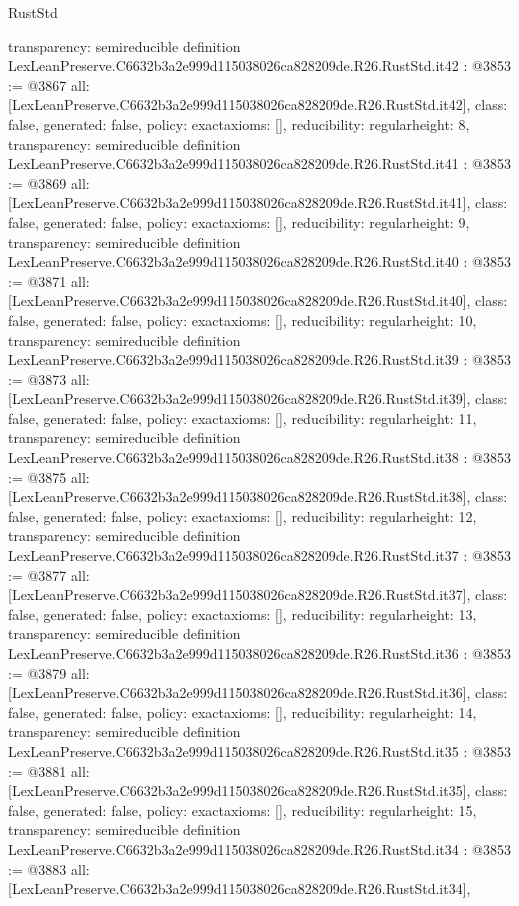 \begin{lexlean}{RustStd}
\begin{coremodule}
{  transparency: semireducible
}
definition LexLeanPreserve.C6632b3a2e999d115038026ca828209de.R26.RustStd.it42 : @3853 := @3867 {
  all: [LexLeanPreserve.C6632b3a2e999d115038026ca828209de.R26.RustStd.it42],
  class: false,
  generated: false,
  policy: exact{axioms: []},
  reducibility: regular{height: 8},
  transparency: semireducible
}
definition LexLeanPreserve.C6632b3a2e999d115038026ca828209de.R26.RustStd.it41 : @3853 := @3869 {
  all: [LexLeanPreserve.C6632b3a2e999d115038026ca828209de.R26.RustStd.it41],
  class: false,
  generated: false,
  policy: exact{axioms: []},
  reducibility: regular{height: 9},
  transparency: semireducible
}
definition LexLeanPreserve.C6632b3a2e999d115038026ca828209de.R26.RustStd.it40 : @3853 := @3871 {
  all: [LexLeanPreserve.C6632b3a2e999d115038026ca828209de.R26.RustStd.it40],
  class: false,
  generated: false,
  policy: exact{axioms: []},
  reducibility: regular{height: 10},
  transparency: semireducible
}
definition LexLeanPreserve.C6632b3a2e999d115038026ca828209de.R26.RustStd.it39 : @3853 := @3873 {
  all: [LexLeanPreserve.C6632b3a2e999d115038026ca828209de.R26.RustStd.it39],
  class: false,
  generated: false,
  policy: exact{axioms: []},
  reducibility: regular{height: 11},
  transparency: semireducible
}
definition LexLeanPreserve.C6632b3a2e999d115038026ca828209de.R26.RustStd.it38 : @3853 := @3875 {
  all: [LexLeanPreserve.C6632b3a2e999d115038026ca828209de.R26.RustStd.it38],
  class: false,
  generated: false,
  policy: exact{axioms: []},
  reducibility: regular{height: 12},
  transparency: semireducible
}
definition LexLeanPreserve.C6632b3a2e999d115038026ca828209de.R26.RustStd.it37 : @3853 := @3877 {
  all: [LexLeanPreserve.C6632b3a2e999d115038026ca828209de.R26.RustStd.it37],
  class: false,
  generated: false,
  policy: exact{axioms: []},
  reducibility: regular{height: 13},
  transparency: semireducible
}
definition LexLeanPreserve.C6632b3a2e999d115038026ca828209de.R26.RustStd.it36 : @3853 := @3879 {
  all: [LexLeanPreserve.C6632b3a2e999d115038026ca828209de.R26.RustStd.it36],
  class: false,
  generated: false,
  policy: exact{axioms: []},
  reducibility: regular{height: 14},
  transparency: semireducible
}
definition LexLeanPreserve.C6632b3a2e999d115038026ca828209de.R26.RustStd.it35 : @3853 := @3881 {
  all: [LexLeanPreserve.C6632b3a2e999d115038026ca828209de.R26.RustStd.it35],
  class: false,
  generated: false,
  policy: exact{axioms: []},
  reducibility: regular{height: 15},
  transparency: semireducible
}
definition LexLeanPreserve.C6632b3a2e999d115038026ca828209de.R26.RustStd.it34 : @3853 := @3883 {
  all: [LexLeanPreserve.C6632b3a2e999d115038026ca828209de.R26.RustStd.it34],
}
\end{coremodule}
\end{lexlean}
